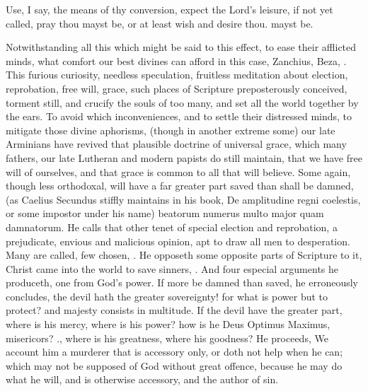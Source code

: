 {Use, I say, the means of thy conversion, expect the Lord's leisure, if
not yet called, pray thou mayst be, or at least wish and desire thou.
mayst be.

Notwithstanding all this which might be said to this effect, to ease
their afflicted minds, what comfort our best divines can afford in this
case, Zanchius, Beza, \etc{}. This furious curiosity, needless speculation,
fruitless meditation about election, reprobation, free will, grace,
such places of Scripture preposterously conceived, torment still, and
crucify the souls of too many, and set all the world together by the
ears. To avoid which inconveniences, and to settle their distressed
minds, to mitigate those divine aphorisms, (though in another extreme
some) our late Arminians have revived that plausible doctrine of
universal grace, which many fathers, our late Lutheran and modern
papists do still maintain, that we have free will of ourselves, and
that grace is common to all that will believe. Some again, though less
orthodoxal, will have a far greater part saved than shall be damned,
(as Caelius Secundus stiffly maintains in his book, De
amplitudine regni coelestis, or some impostor under his name) beatorum
numerus multo major quam damnatorum. He calls that other tenet of
special election and reprobation, a prejudicate, envious and
malicious opinion, apt to draw all men to desperation. Many are called,
few chosen, \etc{}. He opposeth some opposite parts of Scripture to it,
Christ came into the world to save sinners, \etc{}. And four especial
arguments he produceth, one from God's power. If more be damned than
saved, he erroneously concludes, the devil hath the greater
sovereignty! for what is power but to protect? and majesty consists in
multitude. If the devil have the greater part, where is his mercy,
where is his power? how is he Deus Optimus Maximus, misericors? \etc{}.,
where is his greatness, where his goodness? He proceeds, We
account him a murderer that is accessory only, or doth not help when he
can; which may not be supposed of God without great offence, because he
may do what he will, and is otherwise accessory, and the author of sin.

}

